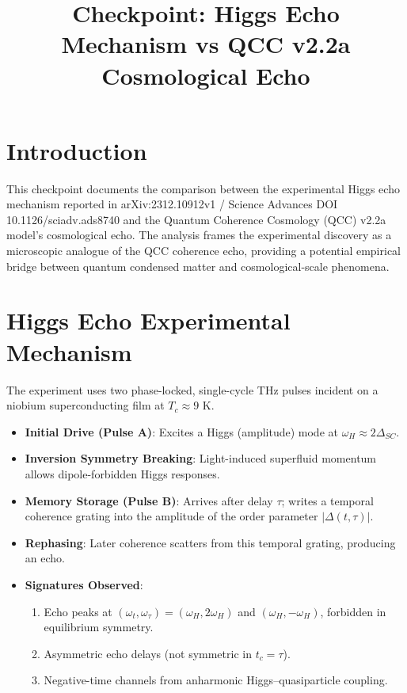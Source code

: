 \documentclass[12pt]{article}
\title{Checkpoint: Higgs Echo Mechanism vs QCC v2.2a Cosmological Echo}
\author{}
\date{}
\begin{document}
\maketitle

\section{Introduction}
This checkpoint documents the comparison between the experimental Higgs echo mechanism reported in arXiv:2312.10912v1 / Science Advances DOI 10.1126/sciadv.ads8740 and the Quantum Coherence Cosmology (QCC) v2.2a model's cosmological echo. The analysis frames the experimental discovery as a microscopic analogue of the QCC coherence echo, providing a potential empirical bridge between quantum condensed matter and cosmological-scale phenomena.

\section{Higgs Echo Experimental Mechanism}
The experiment uses two phase-locked, single-cycle THz pulses incident on a niobium superconducting film at $T_c \approx 9$ K.

\begin{itemize}
    \item \textbf{Initial Drive (Pulse A)}: Excites a Higgs (amplitude) mode at $\omega_H \approx 2\Delta_{SC}$.
    \item \textbf{Inversion Symmetry Breaking}: Light-induced superfluid momentum allows dipole-forbidden Higgs responses.
    \item \textbf{Memory Storage (Pulse B)}: Arrives after delay $\tau$; writes a temporal coherence grating into the amplitude of the order parameter $|\Delta(t,\tau)|$.
    \item \textbf{Rephasing}: Later coherence scatters from this temporal grating, producing an echo.
    \item \textbf{Signatures Observed}:
    \begin{enumerate}
        \item Echo peaks at $(\omega_t,\omega_\tau) = (\omega_H, 2\omega_H)$ and $(\omega_H, -\omega_H)$, forbidden in equilibrium symmetry.
        \item Asymmetric echo delays (not symmetric in $t_c = \tau$).
        \item Negative-time channels from anharmonic Higgs--quasiparticle coupling.
    \end{enumerate}
\end{itemize}
\end{document}

